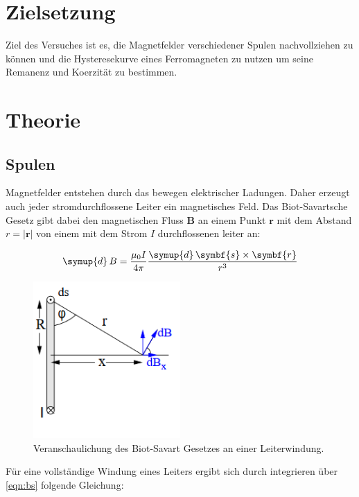 \section{Zielsetzung}
\label{sec:Zielsetzung}

Ziel des Versuches ist es, die Magnetfelder
verschiedener Spulen nachvollziehen zu können
und die Hysteresekurve eines Ferromagneten zu
nutzen um seine Remanenz und Koerzität zu
bestimmen.

\section{Theorie}
\label{sec:Theorie}

\subsection{Spulen}

Magnetfelder entstehen durch das bewegen elektrischer Ladungen.
Daher erzeugt auch jeder stromdurchflossene Leiter ein magnetisches
Feld. Das Biot-Savartsche Gesetz gibt dabei den magnetischen Fluss
$\symbf{B}$ an einem Punkt $\symbf{r}$ mit dem Abstand $r=|\symbf{r}|$
von einem mit dem Strom $I$ durchflossenen leiter an:

\begin{equation}
  \symup{d}\,B=\frac{\mu_0I}{4\pi}\frac{\symup{d}\,\symbf{s}\times\symbf{r}}{r^3}
  \label{eqn:bs}
\end{equation}

\begin{figure}
  \centering
  \includegraphics[width=0.5\textwidth]{content/images/biotsavartidee.png}
  \caption{Veranschaulichung des Biot-Savart Gesetzes an einer Leiterwindung\cite{anleitung}.}
  \label{fig:bs}
\end{figure}

Für eine vollständige Windung eines Leiters ergibt sich
durch integrieren über \eqref{eqn:bs} folgende Gleichung:

